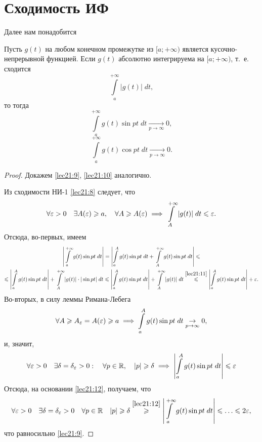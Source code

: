 \documentclass[../../main.tex]{subfiles}
\begin{document}
\section{Сходимость ИФ}

Далее нам понадобится
\begin{thm}
	Пусть $ g(t) $ на любом конечном промежутке из $ [a; +\infty) $
	является кусочно-непрерывной функцией. Если $ g(t) $ 
	абсолютно интегрируема на $ [a; +\infty) $, т.~е.
	сходится 
	\begin{equation}
	\label{lec21:8}
	\int\limits_{a}^{+\infty} |g(t)|\;dt,
	\end{equation} то тогда
	\begin{equation}
	\label{lec21:9}
	\int\limits_{a}^{+\infty} g(t) \sin pt\;dt
	\underset{p \to \infty}{\to} 0,
	\end{equation}
	\begin{equation}
	\label{lec21:10}
	\int\limits_{a}^{+\infty} g(t) \cos pt\;dt
	\underset{p \to \infty}{\to} 0.
	\end{equation}
\end{thm}
\begin{proof}
	Докажем \eqref{lec21:9}, \eqref{lec21:10} аналогично.
	
	Из сходимости НИ-1 \eqref{lec21:8} следует, что
	\begin{equation}
	\label{lec21:11}
	\forall \varepsilon > 0 \quad \exists A(\varepsilon) \geqslant a, \quad
	\forall A \geqslant A(\varepsilon) \implies 
	\int\limits_{A}^{+\infty} |g(t)|\;dt \leqslant \varepsilon.
	\end{equation}
	Отсюда, во-первых, имеем
	\begin{equation}
	\label{lec21:12}
	\begin{gathered}
	\left|  
	\int\limits_{a}^{+\infty} g(t) \sin pt\;dt
	\right| = \left|
	\int\limits_{a}^{A} g(t) \sin pt\;dt +
	\int\limits_{A}^{+\infty} g(t) \sin pt\;dt
	\right| \leqslant \\
	\leqslant \left|
	\int\limits_{a}^{A} g(t) \sin pt\;dt
	\right| +
	\int\limits_{A}^{+\infty} |g(t)|\cdot|\sin pt|\;dt \leqslant
	\left|
	\int\limits_{a}^{A} g(t) \sin pt\;dt
	\right| +
	\int\limits_{A}^{+\infty} |g(t)|\;dt \stackrel{\eqref{lec21:11}}{\leqslant}
	\left|
	\int\limits_{a}^{A} g(t) \sin pt\;dt
	\right| + \varepsilon.
	\end{gathered}
	\end{equation}
	Во-вторых, в силу леммы Римана-Лебега 
	\[
	\forall A \geqslant A_\varepsilon = A(\varepsilon) \geqslant a \implies
	\int\limits_{a}^{A} g(t) \sin pt\;dt \underset{p \to \infty}{\to} 0,
	\]
	и, значит,
	\[
	\forall \varepsilon > 0 \quad \exists \delta = \delta_\varepsilon > 0:\quad
	\forall p \in \mathbb{R},\quad |p| \geqslant \delta \implies
	\left|
	\int\limits_{a}^{A} g(t) \sin pt\;dt
	\right| \leqslant \varepsilon
	\]
	Отсюда, на основании \eqref{lec21:12}, получаем, что
	\[
	\forall \eps > 0 \quad \exists \delta = \delta_\eps > 0 \quad 
	\forall p \in \R \quad |p| \geq \delta
	\stackrel{\eqref{lec21:12}}{\geq}
	\left|
	\int\limits_{a}^{+\infty} g(t) \sin pt\;dt
	\right| \leq \dots \leq 2\eps,
	\] что равносильно \eqref{lec21:9}.
\end{proof}
\end{document}

